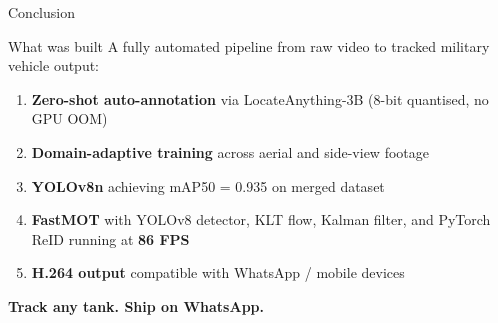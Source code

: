 \documentclass[aspectratio=169]{beamer}
\begin{document}
\begin{frame}{Conclusion}
\begin{block}{What was built}
A fully automated pipeline from raw video to tracked military vehicle output:
\end{block}

\vspace{0.3cm}
\begin{enumerate}
  \item \textbf{Zero-shot auto-annotation} via LocateAnything-3B
        (8-bit quantised, no GPU OOM)
  \item \textbf{Domain-adaptive training} across aerial and side-view footage
  \item \textbf{YOLOv8n} achieving mAP50 = 0.935 on merged dataset
  \item \textbf{FastMOT} with YOLOv8 detector, KLT flow, Kalman filter,
        and PyTorch ReID running at \textbf{86 FPS}
  \item \textbf{H.264 output} compatible with WhatsApp / mobile devices
\end{enumerate}

\vspace{0.3cm}
\begin{center}
\Large\textbf{Track any tank. Ship on WhatsApp.}
\end{center}
\end{frame}
\end{document}
